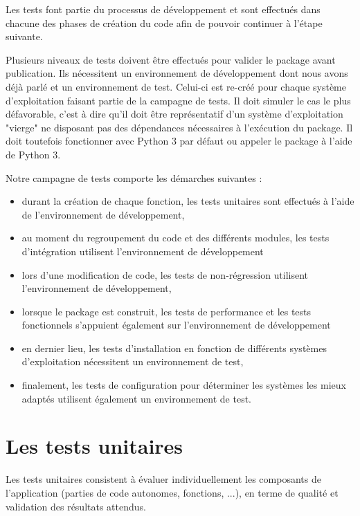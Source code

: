\documentclass[twoside,a4paper,11pt,frenchb,openany]{report}
\begin{document}
Les tests font partie du processus de développement et sont effectués dans chacune des phases de création du code afin de pouvoir continuer à l'étape suivante.

Plusieurs niveaux de tests doivent être effectués pour valider le package avant publication. Ils nécessitent un environnement de développement dont nous avons déjà parlé et un environnement de test. Celui-ci est re-créé pour chaque système d'exploitation faisant partie de la campagne de tests. Il doit simuler le cas le plus défavorable, c'est à dire qu'il doit être représentatif d'un système d'exploitation "vierge" ne disposant pas des dépendances nécessaires à l'exécution du package. Il doit toutefois fonctionner avec Python 3 par défaut ou appeler le package à l'aide de Python 3. 

Notre campagne de tests comporte les démarches suivantes :
\begin{itemize}
\item durant la création de chaque fonction, les tests unitaires sont effectués à l'aide de l'environnement de développement,
\item au moment du regroupement du code et des différents modules, les tests d'intégration utilisent l'environnement de développement
\item lors d'une modification de code, les tests de non-régression utilisent l'environnement de développement,
\item lorsque le package est construit, les tests de performance et les tests fonctionnels s'appuient également sur l'environnement de développement
\item en dernier lieu, les tests d'installation en fonction de différents systèmes d'exploitation nécessitent un environnement de test,
\item finalement, les tests de configuration pour déterminer les systèmes les mieux adaptés utilisent également un environnement de test.
\end{itemize}







\section{Les tests unitaires}

Les tests unitaires consistent à évaluer individuellement les composants de l'application (parties de code autonomes, fonctions, ...), en terme de qualité et validation des résultats attendus.
\end{document}
